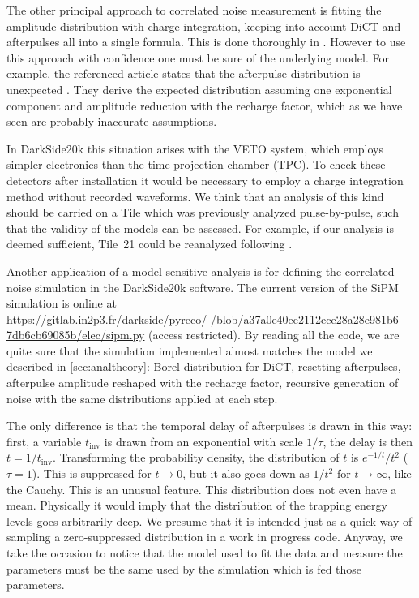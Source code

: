 The other principal approach to correlated noise measurement is fitting the
amplitude distribution with charge integration, keeping into account DiCT and
afterpulses all into a single formula. This is done thoroughly in
\cite{chmill2017}. However to use this approach with confidence one must be
sure of the underlying model. For example, the referenced article states that
the afterpulse distribution is unexpected \cite[app.~A]{chmill2017}. They
derive the expected distribution assuming one exponential component and
amplitude reduction with the recharge factor, which as we have seen are
probably inaccurate assumptions.

In DarkSide20k this situation arises with the VETO system, which employs
simpler electronics than the time projection chamber (TPC). To check these
detectors after installation it would be necessary to employ a charge
integration method without recorded waveforms. We think that an analysis of
this kind should be carried on a Tile which was previously analyzed
pulse-by-pulse, such that the validity of the models can be assessed. For
example, if our analysis is deemed sufficient, Tile~21 could be reanalyzed
following \cite{chmill2017}.


Another application of a model-sensitive analysis is for defining the
correlated noise simulation in the DarkSide20k software. The current version of
the SiPM simulation is online at
\url{https://gitlab.in2p3.fr/darkside/pyreco/-/blob/a37a0e40ee2112ece28a28e981b6
 7db6cb69085b/elec/sipm.py} (access restricted). By reading all the code, we
are quite sure that the simulation implemented almost matches the model we
described in \autoref{sec:analtheory}: Borel distribution for DiCT, resetting
afterpulses, afterpulse amplitude reshaped with the recharge factor, recursive
generation of noise with the same distributions applied at each step.

The only difference is that the temporal delay of afterpulses is drawn in this
way: first, a variable $t_\text{inv}$ is drawn from an exponential with scale
$1/\tau$, the delay is then $t = 1/t_\text{inv}$. Transforming the probability
density, the distribution of $t$ is $e^{-1/t}/t^2$ ($\tau = 1$). This is
suppressed for $t\to 0$, but it also goes down as $1/t^2$ for $t\to\infty$,
like the Cauchy. This is an unusual feature. This distribution does not even
have a mean. Physically it would imply that the distribution of the trapping
energy levels goes arbitrarily deep. We presume that it is intended just as a
quick way of sampling a zero-suppressed distribution in a work in progress
code. Anyway, we take the occasion to notice that the model used to fit the
data and measure the parameters must be the same used by the simulation which
is fed those parameters.
